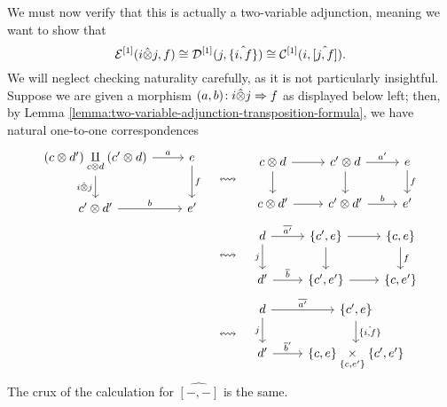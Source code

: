 \begin{construction}
	We must now verify that this is actually a two-variable adjunction, meaning we want to show that
	\[ \mathcal{E}^{[1]}(i\hat\otimes j, f) \cong \mathcal{D}^{[1]}(j, \hat{ \{i,f\} }) \cong \mathcal{C}^{[1]}(i, \hat{ [j,f] }). \]
	We will neglect checking naturality carefully, as it is not particularly insightful. Suppose we are given a morphism \((a,b)\!:i\hat\otimes j \Rightarrow f\) as displayed below left;
	then, by Lemma \ref{lemma:two-variable-adjunction-transposition-formula}, we have natural one-to-one correspondences
	\begin{align*}
		\begin{tikzcd}[ampersand replacement=\&]
			(c\otimes d') \underset{c\otimes d}\amalg(c'\otimes d) \ar[d,"i\hat\otimes j"']\ar[r,"a"] \& e\ar[d,"f"] \\
			c'\otimes d'\ar[r,"b"] \& e'
		\end{tikzcd} \quad &\leftrightsquigarrow \quad
		\begin{tikzcd}[ampersand replacement=\&]
			c\otimes d\ar[r]\ar[d] \& c'\otimes d \ar[d]\ar[r,"a'"] \& e\ar[d,"f"] \\
			c\otimes d'\ar[r] \& c'\otimes d'\ar[r,"b"] \& e'
		\end{tikzcd} \\
		&\leftrightsquigarrow \quad
		\begin{tikzcd}[ampersand replacement=\&]
			d\ar[r,"\overline{a'}"]\ar[d,"j"'] \& \{c',e\} \ar[d]\ar[r] \& \{c,e\} \ar[d,"f"] \\
			d'\ar[r,"\overline{b}"] \& \{c',e'\}\ar[r] \& \{c,e'\}
		\end{tikzcd} \\
		&\leftrightsquigarrow \quad
		\begin{tikzcd}[ampersand replacement=\&]
			d\ar[r,"\overline{a'}"]\ar[d,"j"'] \& \{c',e\} \ar[d,"\hat{ \{i,f\} }"] \\
			d'\ar[r,"\overline{b}'"] \& \{c,e\}\underset{\{c,e'\}}\times \{c',e'\}
		\end{tikzcd}
	\end{align*}
	The crux of the calculation for \(\hat{[-,-]}\) is the same.
\end{construction}

